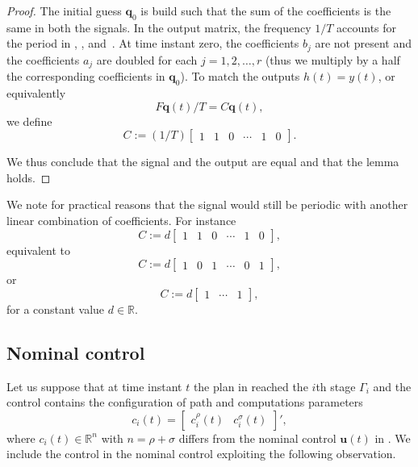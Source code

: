 \begin{proof}
The initial guess $\mathbf{q}_0$ is build such that the sum of the coefficients is the same in both the signals. In the output matrix, the frequency $1/T$ accounts for the period in , , and~. At time instant zero, the coefficients $b_j$ are not present and the coefficients $a_j$ are doubled for each $j=1,2,\dots,r$ (thus we multiply by a half the corresponding coefficients in $\mathbf{q}_0$). To match the outputs $h(t)=y(t)$, or equivalently 
\begin{equation}
  F\mathbf{q}(t)/T=C\mathbf{q}(t), 
\end{equation}
we define 
\begin{equation}
  C:=(1/T)\begin{bmatrix}1 & 1 & 0 & \cdots & 1 & 0\end{bmatrix}.
\end{equation}

We thus conclude that the signal and the output are equal and that the lemma holds.

\end{proof}

We note for practical reasons that the signal would still be periodic with another linear combination of coefficients. For instance
\begin{equation}\label{eq:mat_C_generic}
  C:=d\begin{bmatrix}1 & 1 & 0 & \cdots & 1 & 0\end{bmatrix},
\end{equation} 
equivalent to
\begin{equation}
  C:=d\begin{bmatrix}1 & 0 & 1 & \cdots & 0 & 1\end{bmatrix},
\end{equation} 
or 
\begin{equation}
  C:=d\begin{bmatrix}1 & \cdots & 1\end{bmatrix},
\end{equation} 
for a constant value $d\in\mathbb{R}$.

\subsection{Nominal control}
\label{sec:nom-cont}

Let us suppose that at time instant $t$ the plan in  reached the $i$th stage $\Gamma_i$ and the control contains the configuration of path and computations parameters 
\begin{equation}\label{eq:state-control2}
  c_i(t)=\begin{bmatrix}c_i^\rho(t) & c_i^\sigma(t)\end{bmatrix}',
\end{equation}
where $c_i(t)\in\mathbb{R}^n$ with $n=\rho+\sigma$ differs from the nominal control $\mathbf{u}(t)$ in . We include the control in the nominal control exploiting the following observation. 

